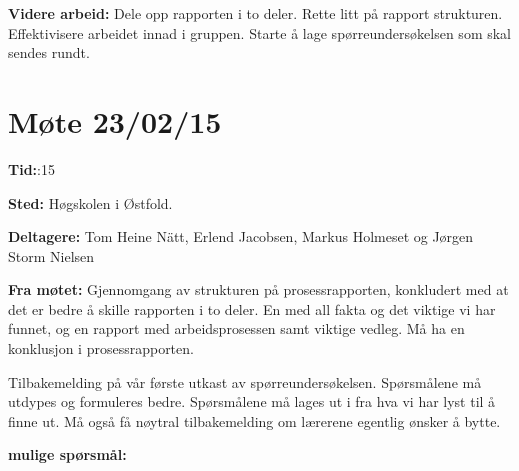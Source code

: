 \vspace{20pt}

\hspace{-17pt}\textbf{Videre arbeid:}\newline
Dele opp rapporten i to deler.\newline
Rette litt på rapport strukturen.\newline
Effektivisere arbeidet innad i gruppen.\newline
Starte å lage spørreundersøkelsen som skal sendes rundt.\newline



\newpage



\section{Møte 23/02/15}

\vspace{30pt}
\textbf{Tid:}:15\newline

\hspace{-17pt}\textbf{Sted:}\newline 
Høgskolen i Østfold.\newline

\hspace{-17pt}\textbf{Deltagere:}\newline 
Tom Heine Nätt, Erlend Jacobsen, Markus Holmeset og Jørgen Storm Nielsen\newline

\hspace{-17pt}\textbf{Fra møtet:}\newline
Gjennomgang av strukturen på prosessrapporten, konkludert med at det er bedre å skille rapporten i to deler. En med all fakta og det viktige vi har funnet, og en rapport med arbeidsprosessen samt viktige vedleg. Må ha en konklusjon i prosessrapporten.

Tilbakemelding på vår første utkast av spørreundersøkelsen. Spørsmålene må utdypes og formuleres bedre. Spørsmålene må lages ut i fra hva vi har lyst til å finne ut. Må også få nøytral tilbakemelding om lærerene egentlig ønsker å bytte.\newline

\hspace{-17pt}\textbf{mulige spørsmål:} \newline

